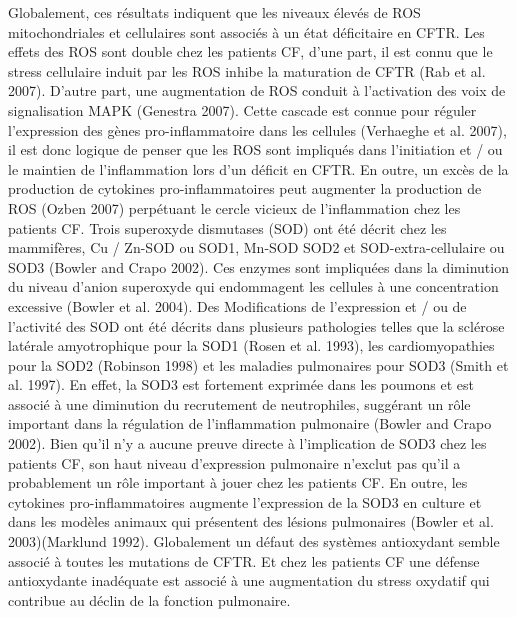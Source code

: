 Globalement, ces résultats indiquent que les niveaux élevés de ROS mitochondriales et cellulaires sont associés à un état déficitaire en CFTR. Les effets des ROS sont double chez les patients CF, d'une part, il est connu que le stress cellulaire induit par les ROS inhibe la maturation de CFTR (Rab et al. 2007)\cite{rab_endoplasmic_2007}.
D’autre part, une augmentation de ROS conduit à l’activation des voix de signalisation MAPK (Genestra 2007)\cite{genestra_oxyl_2007}. Cette cascade est connue pour réguler l’expression des gènes pro-inflammatoire dans les cellules (Verhaeghe et al. 2007)\cite{verhaeghe_role_2007}, il est donc logique de penser que les ROS sont impliqués dans l'initiation et / ou le maintien de l'inflammation lors d’un déficit en CFTR. En outre, un excès de la production de cytokines pro-inflammatoires peut augmenter la production de ROS (Ozben 2007)\cite{ozben_oxidative_2007} perpétuant le cercle vicieux de l’inflammation chez les patients CF.
Trois superoxyde dismutases (SOD) ont été décrit chez les mammifères, Cu / Zn-SOD ou SOD1, Mn-SOD SOD2 et SOD-extra-cellulaire ou SOD3 (Bowler and Crapo 2002)\cite{bowler_oxidative_2002}. Ces enzymes sont impliquées dans la diminution du niveau d’anion superoxyde qui endommagent les cellules à une concentration excessive (Bowler et al. 2004)\cite{bowler_extracellular_2004}. Des Modifications de l'expression et / ou de l'activité des SOD ont été décrits dans plusieurs pathologies telles que la sclérose latérale amyotrophique pour la SOD1 (Rosen et al. 1993)\cite{rosen_mutations_1993}, les cardiomyopathies pour la SOD2 (Robinson 1998)\cite{robinson_role_1998} et les maladies pulmonaires pour SOD3 (Smith et al. 1997)\cite{smith_reduced_1997}. En effet, la SOD3 est fortement exprimée dans les poumons et est associé à une diminution du recrutement de neutrophiles, suggérant un rôle important dans la régulation de l'inflammation pulmonaire (Bowler and Crapo 2002)\cite{bowler_oxidative_2002}.
Bien qu’il n’y a aucune preuve directe à l’implication de SOD3 chez les patients CF, son haut niveau d’expression pulmonaire n’exclut pas qu’il a probablement un rôle important à jouer chez les patients CF. En outre, les cytokines pro-inflammatoires augmente l'expression de la SOD3 en culture et dans les modèles animaux qui présentent des lésions pulmonaires (Bowler et al. 2003)\cite{bowler_evidence_2003}(Marklund 1992)\cite{marklund_regulation_1992}.
Globalement un défaut des systèmes antioxydant semble associé à toutes les mutations de CFTR. Et chez les patients CF une défense antioxydante inadéquate est associé à une augmentation du stress oxydatif qui contribue au déclin de la fonction pulmonaire.




